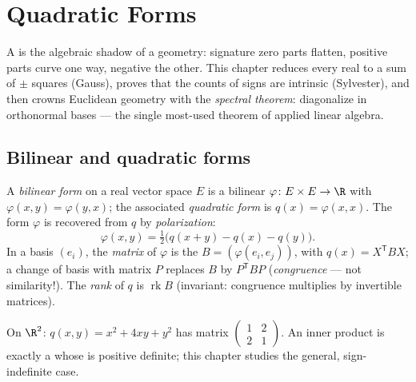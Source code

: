 \chapter{Quadratic Forms}\label{ch:b2:quadratic}

A  is the algebraic shadow of a geometry: signature
zero parts flatten, positive parts curve one way, negative the
other. This chapter reduces every real  to a sum of
$\pm$ squares (Gauss), proves that the counts of signs are intrinsic
(Sylvester), and then crowns Euclidean geometry with the
\emph{spectral theorem}:  diagonalize in
orthonormal bases --- the single most-used theorem of applied
linear algebra.

\section{Bilinear and quadratic forms}

\begin{definition}\label{def:b2:quadratic:def}
A \emph{ bilinear form} on a real vector space $E$ is a
bilinear $\varphi \colon E \times E \to \R$ with $\varphi(x, y) =
\varphi(y, x)$; the associated \emph{quadratic
form} is $q(x) = \varphi(x, x)$. The form
$\varphi$ is recovered from $q$ by
\emph{polarization}:
\[
\varphi(x, y) = \tfrac12\bigl(q(x + y) - q(x) - q(y)\bigr).
\]
In a basis $(e_i)$, the \emph{matrix} of $\varphi$ is the 
$B = (\varphi(e_i, e_j))$, with $q(x) = X^{\mathsf T} B X$; a change
of basis with matrix $P$ replaces $B$ by $P^{\mathsf T} B P$
(\emph{congruence} --- not similarity!).
The \emph{rank} of $q$ is $\operatorname{rk} B$ (invariant:
congruence multiplies by invertible matrices).
\end{definition}

\begin{example}
On $\R^2$: $q(x, y) = x^2 + 4xy + y^2$ has matrix $\begin{pmatrix}
1 & 2\\ 2 & 1\end{pmatrix}$. An inner product is exactly a
 whose  is positive definite;
this chapter studies the general, sign-indefinite case.
\end{example}


